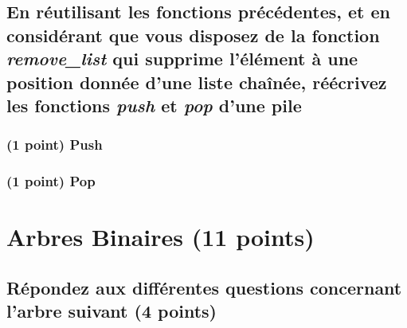 \documentclass[11pt,a4paper]{article}
\begin{document}

\clearpage



\subsection{En réutilisant les fonctions précédentes, et en considérant que vous disposez de la fonction \textit{remove\_list} qui supprime l'élément à une position donnée d'une liste chaînée, réécrivez les fonctions \textit{push} et \textit{pop} d'une pile }

\subsubsection{(1 point) Push }



\subsubsection{(1 point) Pop }


\clearpage


\section{Arbres Binaires (11 points)}

\subsection{Répondez aux différentes questions concernant l'arbre suivant (4 points) }

\bigskip
\end{document}
